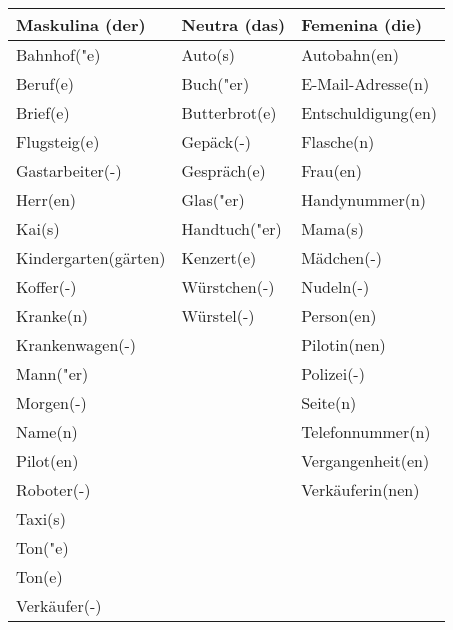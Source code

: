 \documentclass{article}
\renewcommand{\arraystretch}{1}
\begin{document}
\begin{table}[h!]
    \centering
    \label{tab:tabla1}
    \renewcommand{\arraystretch}{1.5}
    \begin{tabular}{|>{\raggedright\arraybackslash}p{5cm}|>{\raggedright\arraybackslash}p{5cm}|>{\raggedright\arraybackslash}p{5cm}|}
        \hline
        \rowcolor{gray!20} \textbf{Maskulina (der)} & \textbf{Neutra (das)} & \textbf{Femenina (die)} \\
        \hline
        Bahnhof("e) & Auto(s) & Autobahn(en) \\\hline
        Beruf(e) & Buch("er) & E-Mail-Adresse(n) \\\hline
        Brief(e) & Butterbrot(e) & Entschuldigung(en) \\\hline
        Flugsteig(e) & Gepäck(-) & Flasche(n) \\\hline
        Gastarbeiter(-) & Gespräch(e) & Frau(en) \\\hline
        Herr(en) & Glas("er) & Handynummer(n) \\\hline
        Kai(s) & Handtuch("er) & Mama(s) \\\hline
        Kindergarten(gärten) & Kenzert(e) & Mädchen(-) \\\hline
        Koffer(-) & Würstchen(-) & Nudeln(-) \\\hline
        Kranke(n) & Würstel(-) & Person(en) \\\hline
        Krankenwagen(-) &  & Pilotin(nen) \\\hline
        Mann("er) &  & Polizei(-) \\\hline
        Morgen(-) &  & Seite(n) \\\hline
        Name(n) &  & Telefonnummer(n) \\\hline
        Pilot(en) &  & Vergangenheit(en) \\\hline
        Roboter(-) &  & Verkäuferin(nen) \\\hline
        Taxi(s) &  &  \\\hline
        Ton("e) &  &  \\\hline
        Ton(e) &  &  \\\hline
        Verkäufer(-) &  &  \\\hline
    \end{tabular}
\end{table}
\end{document}
